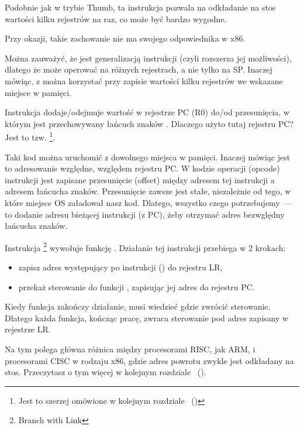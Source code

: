 Podobnie jak \PUSH w trybie Thumb, ta instrukcja pozwala na odkładanie na stos wartości kilku rejestrów na raz, co może być bardzo wygodne.

Przy okazji, takie zachowanie nie ma swojego odpowiednika w x86.

Można zauważyć, że  jest generalizacją instrukcji \PUSH (czyli rozszerza jej możliwości), dlatego że może operować na różnych rejestrach, a nie tylko na \ac{SP}.
Inaczej mówiąc, z  można korzystać przy zapisie wartości kilku rejestrów we wskazane miejsce w pamięci.

\myindex{\PICcode}
Instrukcja  dodaje/odejmuje wartość w rejestrze \ac{PC} (R0) do/od przesunięcia, w którym jest przechowywany łańcuch znaków
.
Dlaczego użyto tutaj rejestru \ac{PC}? Jest to tzw. \q{\PICcode}
\footnote{Jest to szerzej omówione w kolejnym rozdziale ~()}.

Taki kod można uruchomić z dowolnego miejsca w pamięci.
Inaczej mówiąc jest to adresowanie względne, względem rejestru \ac{PC}.
W kodzie operacji (opcode) instrukcji  jest zapisane przesunięcie (offset) między adresem tej instrukcji a adresem łańcucha znaków.
Przesunięcie zawsze jest stałe, niezależnie od tego, w które miejsce \ac{OS} załadował nasz kod.
Dlatego, wszystko czego potrzebujemy~--- to dodanie adresu bieżącej instrukcji (z \ac{PC}), żeby otrzymać adres bezwględny łańcucha znaków.

Instrukcja \footnote{Branch with Link} wywołuje funkcję \printf.
Działanie tej instrukcji przebiega w 2 krokach:

\begin{itemize}
\item zapisz adres występujący po instrukcji  () do rejestru \ac{LR},
\item przekaż sterowanie do funkcji \printf, zapisując jej adres do rejestru \ac{PC}.
\end{itemize}

Kiedy funkcja \printf zakończy działanie, musi wiedzieć gdzie zwrócić sterowanie. Dlatego każda funkcja, kończąc pracę, zwraca sterowanie pod adres zapisany w rejestrze \ac{LR}.

Na tym polega główna różnica między  procesorami \ac{RISC}, jak ARM, i procesorami \ac{CISC} w rodzaju x86,
gdzie adres powrotu zwykle jest odkładany na stos. Przeczytasz o tym więcej w kolejnym rozdziale ~().

